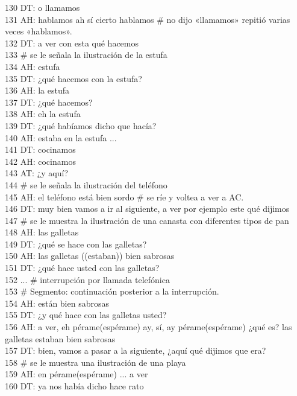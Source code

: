 130 DT: o llamamos\\
131 AH: hablamos ah sí cierto hablamos # no dijo «llamamos» repitió varias veces «hablamos».\\
132 DT: a ver con esta qué hacemos\\
133 # se le señala la ilustración de la estufa\\
134 AH: estufa\\
135 DT: ¿qué hacemos con la estufa?\\
136 AH: la estufa\\
137 DT: ¿qué hacemos?\\
138 AH: eh la estufa\\
139 DT: ¿qué habíamos dicho que hacía?\\
140 AH: estaba en la estufa ...\\
141 DT: cocinamos\\
142 AH: cocinamos\\
143 AT: ¿y aquí?\\
144 # se le señala la ilustración del teléfono\\
145 AH: el teléfono está bien sordo # se ríe y voltea a ver a AC.\\
146 DT: muy bien vamos a ir al siguiente, a ver por ejemplo este qué dijimos\\
147 # se le muestra la ilustración de una canasta con diferentes tipos de pan\\
148 AH: las galletas\\
149 DT: ¿qué se hace con las galletas?\\
150 AH: las galletas ((estaban)) bien sabrosas\\
151 DT: ¿qué hace usted con las galletas?\\
152 ... # interrupción por llamada telefónica\\
153 # Segmento: continuación posterior a la interrupción.\\
154 AH: están bien sabrosas\\
155 DT: ¿y qué hace con las galletas usted?\\
156 AH: a ver, eh pérame(espérame) ay, sí, ay pérame(espérame) ¿qué es? las galletas estaban bien sabrosas\\
157 DT: bien, vamos a pasar a la siguiente, ¿aquí qué dijimos que era?\\
158 # se le muestra una ilustración de una playa\\
159 AH: en pérame(espérame) ... a ver\\
160 DT: ya nos había dicho hace rato\\
